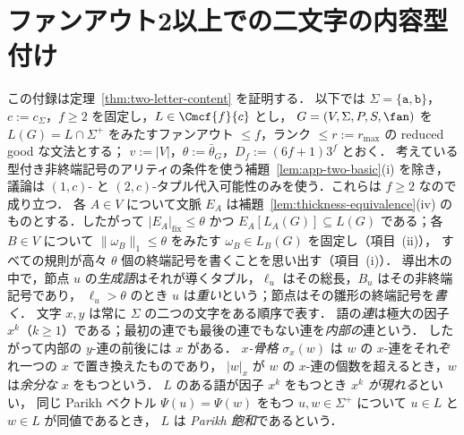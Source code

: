 \section{ファンアウト2以上での二文字の内容型付け}
\label{app:two-letter-content}

この付録は定理~\ref{thm:two-letter-content} を証明する．
以下では $\Sigma=\{\mathtt a,\mathtt b\}$，$c:=c_\Sigma$，$f\ge2$ を固定し，$L\in\Cmcf{f}{c}$ とし，
$G=(V,\Sigma,P,S,\fan)$ を $L(G)=L\cap\Sigma^+$ をみたすファンアウト $\le f$，ランク $\le r:=r_{\max}$ の reduced good な文法とする；
$v:=|V|$，$\theta:=\bar\theta_G$，$D_f:=(6f+1)3^f$ とおく．
考えている型付き非終端記号のアリティの条件を使う補題~\ref{lem:app-two-basic}(i) を除き，
議論は $(1,c)$- と $(2,c)$-タプル代入可能性のみを使う．これらは $f\ge2$ なので成り立つ．
各 $A\in V$ について文脈 $E_A$ は補題~\ref{lem:thickness-equivalence}(iv) のものとする．したがって $|E_A|_{\mathrm{fix}}\le\theta$
かつ $E_A[L_A(G)]\subseteq L(G)$ である；各 $B\in V$ について $\|\omega_B\|_1\le\theta$ をみたす $\omega_B\in L_B(G)$ を固定し（項目~(ii)），
すべての規則が高々 $\theta$ 個の終端記号を書くことを思い出す（項目~(i)）．
導出木の中で，節点 $u$ の\emph{生成語}はそれが導くタプル，$\ell_u$ はその総長，$B_u$ はその非終端記号であり，
$\ell_u>\theta$ のとき $u$ は\emph{重い}という；節点はその雛形の終端記号を\emph{書く}．
文字 $x,y$ は常に $\Sigma$ の二つの文字をある順序で表す．
語の\emph{連}は極大の因子 $x^k$（$k\ge1$）である；最初の連でも最後の連でもない連を\emph{内部の}連という．
したがって内部の $y$-連の前後には $x$ がある．
\emph{$x$-骨格} $\sigma_x(w)$ は $w$ の $x$-連をそれぞれ一つの $x$ で置き換えたものであり，
$|w|_x$ が $w$ の $x$-連の個数を超えるとき，$w$ は\emph{余分な} $x$ をもつという．
$L$ のある語が因子 $x^k$ をもつとき \emph{$x^k$ が現れる}といい，
同じ Parikh ベクトル $\Psi(u)=\Psi(w)$ をもつ $u,w\in\Sigma^+$ について $u\in L$ と $w\in L$ が同値であるとき，
$L$ は \emph{Parikh 飽和}であるという．

